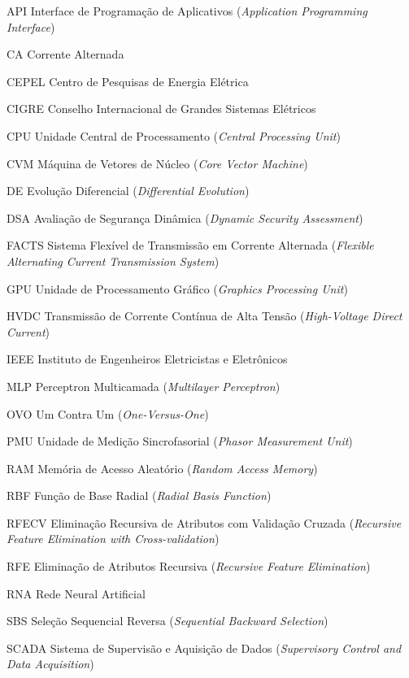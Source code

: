 \documentclass[12pt,oneside,a4paper,chapter=TITLE,section=TITLE,sumario=tradicional,english,brazil]{abntex2}
\begin{document}
\begin{siglas}
  \item[API] Interface de Programação de Aplicativos (\textit{Application Programming Interface})
  \item[CA] Corrente Alternada
  \item[CEPEL] Centro de Pesquisas de Energia Elétrica
  \item[CIGRE] Conselho Internacional de Grandes Sistemas Elétricos
  \item[CPU] Unidade Central de Processamento (\textit{Central Processing Unit})
  \item[CVM] Máquina de Vetores de Núcleo (\textit{Core Vector Machine})
  \item[DE] Evolução Diferencial (\textit{Differential Evolution})
  \item[DSA] Avaliação de Segurança Dinâmica (\textit{Dynamic Security Assessment})
  \item[FACTS] Sistema Flexível de Transmissão em Corrente Alternada (\textit{Flexible Alternating Current Transmission System})
  \item[GPU] Unidade de Processamento Gráfico (\textit{Graphics Processing Unit})
  \item[HVDC] Transmissão de Corrente Contínua de Alta Tensão (\textit{High-Voltage Direct Current})
  \item[IEEE] Instituto de Engenheiros Eletricistas e Eletrônicos
  \item[MLP] Perceptron Multicamada (\textit{Multilayer Perceptron})
  \item[OVO] Um Contra Um (\textit{One-Versus-One})
  \item[PMU] Unidade de Medição Sincrofasorial (\textit{Phasor Measurement Unit})
  \item[RAM] Memória de Acesso Aleatório (\textit{Random Access Memory})
  \item[RBF] Função de Base Radial (\textit{Radial Basis Function})
  \item[RFECV] Eliminação Recursiva de Atributos com Validação Cruzada (\textit{Recursive Feature Elimination with Cross-validation})
  \item[RFE] Eliminação de Atributos Recursiva (\textit{Recursive Feature Elimination})
  \item[RNA] Rede Neural Artificial
  \item[SBS] Seleção Sequencial Reversa (\textit{Sequential Backward Selection})
  \item[SCADA] Sistema de Supervisão e Aquisição de Dados (\textit{Supervisory Control and Data Acquisition})

\end{siglas}
\end{document}
